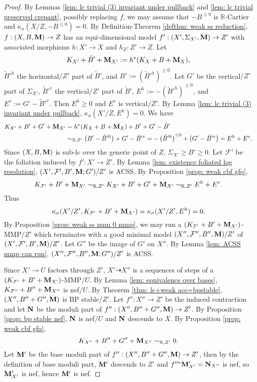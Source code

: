 \documentclass[11pt]{amsart}
\numberwithin{equation}{section}
\newcommand{\Mm}{{\bf{M}}}
\newcommand{\Nn}{{\bf{N}}}
\newcommand{\Rr}{\mathbb{R}}
\newcommand{\Ff}{\mathcal{F}}
\theoremstyle{definition}
\theoremstyle{definition}
\theoremstyle{definition}
\begin{document}
\begin{proof}
By Lemmas \ref{lem: lc trivial (3) invariant under pullback} and \ref{lem: lc trivial preserved crepant}, possibly replacing $f$, we may assume that $-B^{\leq 0}$ is $\Rr$-Cartier and $\kappa_{\sigma}(X/Z,-B^{\leq 0})=0$. By Definition-Theorem \ref{defthm: weak ss reduction}, $f: (X,B,\Mm)\rightarrow Z$ has an equi-dimensional model $f': (X',\Sigma_{X'},\Mm)\rightarrow Z'$ with associated morphisms $h: X'\to X$ and $h_Z: Z'\rightarrow Z$. Let
$$K_{X'}+\tilde B'+\Mm_{X'}:=h^*(K_X+B+\Mm_X),$$
$\tilde B'^h$ the horizontal$/Z'$ part of $\tilde B'$, and $B':=(\tilde B'^h)^{\geq 0}$. Let $G'$ be the vertical$/Z'$ part of $\Sigma_{X'}$, $\tilde B'^v$ the vertical$/Z'$ part of $\tilde B'$, $E^h:=-(\tilde B'^h)^{\leq 0}$, and $E^v:=G'-\tilde B'^v$. Then $E^h\geq 0$ and $E^v$ is vertical$/Z'$. By Lemma \ref{lem: lc trivial (3) invariant under pullback}, $\kappa_{\sigma}(X'/Z,E^h)=0$. We have
\begin{align*}
    K_{X'}+B'+G'+\Mm_{X'}&=h^*(K_X+B+\Mm_X)+B'+G'-\tilde B'\\
    &\sim_{\mathbb R,Z'}\left(B'-\tilde B'^h\right)+G'-\tilde B'^v=-\left(\tilde B'^h\right)^{\leq 0}+\left(G'-\tilde B'^v\right)=E^h+E^v.
\end{align*}
Since $(X,B,\Mm)$ is sub-lc over the generic point of $Z$, $\Sigma_{X'}\geq B'\geq 0$. Let $\Ff'$ be the foliation induced by $f': X'\rightarrow Z'$. By Lemma \ref{lem: existence foliated log resolution}, $(X',\Ff',B',\Mm;G')/Z'$ is ACSS. By Proposition \ref{prop: weak cbf gfq}, 
$$K_{\Ff'}+B'+\Mm_{X'}\sim_{\mathbb R,Z'}K_{X'}+B'+G'+\Mm_{X'}\sim_{\mathbb R,Z'}E^h+E^v.$$
Thus
$$\kappa_{\sigma}(X'/Z',K_{\Ff'}+B'+\Mm_{X'})=\kappa_{\sigma}(X'/Z',E^h)=0.$$
By Proposition \ref{prop: weak ss num 0 mmp}, we may run a $(K_{\Ff'}+B'+\Mm_{X'})$-MMP$/Z'$ which terminates with a good minimal model $(X'',\Ff'',B'',\Mm)/Z'$ of $(X',\Ff',B',\Mm)/Z'$. Let  $G''$ be the image of $G'$ on $X''$. By Lemma \ref{lem: ACSS mmp can run}, $(X'',\Ff'',B'',\Mm;G'')/Z'$ is ACSS.

Since $X'\rightarrow U$ factors through $Z'$, $X'\dashrightarrow X''$ is a sequences of steps of a $(K_{\Ff'}+B'+\Mm_{X'})$-MMP$/U$. By Lemma \ref{lem: equivalence over bases}, $K_{\Ff''}+B''+\Mm_{X''}$ is nef$/U$. By Theorem \ref{thm: lc+weak acc=bpstable}, $(X'',B''+G'',\Mm)$ is BP stable$/Z'$. Let $f'': X''\rightarrow Z'$ be the induced contraction and let $\Nn$ be the moduli part of $f'': (X'',B''+G'',\Mm)\rightarrow Z'$. By Proposition \ref{prop: bp stable nef}, $\Nn$ is nef$/U$ and $\Nn$ descends to $X$. By Proposition \ref{prop: weak cbf gfq}, $$K_{X''}+B''+G''+\Mm_{X''}\sim_{\mathbb R,Z'}0.$$
Let $\Mm'$ be the base moduli part of  $f'': (X'',B''+G'',\Mm)\rightarrow Z'$, then by the definition of base moduli part, $\Mm'$ descends to $Z'$ and $f''^*\Mm'_{X'}=\Nn_{X''}$ is nef, so $\Mm'_{X'}$ is nef, hence $\Mm'$ is nef.


\end{proof}
\end{document}
